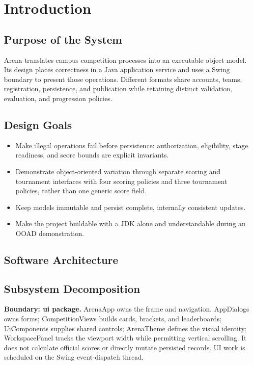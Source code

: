 \documentclass[12pt]{article}
\begin{document}
\section{Introduction}
\subsection{Purpose of the System}
Arena translates campus competition processes into an executable object model. Its design places correctness in a Java application service and uses a Swing boundary to present those operations. Different formats share accounts, teams, registration, persistence, and publication while retaining distinct validation, evaluation, and progression policies.
\subsection{Design Goals}
\begin{itemize}
\item Make illegal operations fail before persistence: authorization, eligibility, stage readiness, and score bounds are explicit invariants.
\item Demonstrate object-oriented variation through separate scoring and tournament interfaces with four scoring policies and three tournament policies, rather than one generic score field.
\item Keep models immutable and persist complete, internally consistent updates.
\item Make the project buildable with a JDK alone and understandable during an OOAD demonstration.
\end{itemize}

\begin{umlpage}
\section{Software Architecture}
\subsection{Subsystem Decomposition}
\end{umlpage}
\textbf{Boundary: ui package.} ArenaApp owns the frame and navigation. AppDialogs owns forms; CompetitionViews builds cards, brackets, and leaderboards; UiComponents supplies shared controls; ArenaTheme defines the visual identity; WorkspacePanel tracks the viewport width while permitting vertical scrolling. It does not calculate official scores or directly mutate persisted records. UI work is scheduled on the Swing event-dispatch thread.
\end{document}
